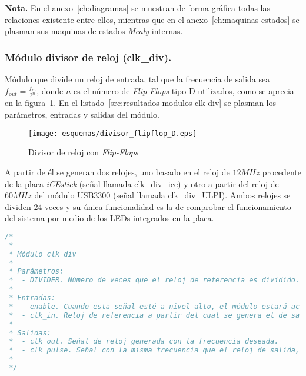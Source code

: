 \textbf{Nota.} En el anexo~\ref{ch:diagramas} se muestran de forma gráfica todas las relaciones existente entre ellos, mientras que en el anexo~\ref{ch:maquinas-estados} se plasman sus maquinas de estados \emph{Mealy} internas.

\subsubsection{Módulo divisor de reloj (clk\_div).}
Módulo que divide un reloj de entrada, tal que la frecuencia de salida sea $f_{out} = \frac{f_{in}}{2^n}$, donde $n$ es el número de \emph{Flip-Flops} tipo D utilizados, como se aprecia en la figura~\ref{fig:clk_div_esquema}. En el listado~\ref{src:resultados-modulos-clk-div} se plasman los parámetros, entradas y salidas del módulo.

\begin{figure}[hbt]
    \centering
    \texttt{[image: esquemas/divisor\_flipflop\_D.eps]}
    \caption{Divisor de reloj con \emph{Flip-Flops}}
    \label{fig:clk_div_esquema}
\end{figure}

A partir de él se generan dos relojes, uno basado en el reloj de $12MHz$ procedente de la placa \emph{iCEstick} (señal llamada clk\_div\_ice) y otro a partir del reloj de $60MHz$ del módulo USB3300 (señal  llamada clk\_div\_ULPI). Ambos relojes se dividen 24 veces y su única funcionalidad es la de  comprobar el funcionamiento del sistema por medio de los LEDs integrados en la placa.

\begin{lstlisting}[language=Verilog,
    caption={Parámetros, entradas y salidas del módulo clk\_div.},
    label=src:resultados-modulos-clk-div]
/*
 *
 * Módulo clk_div
 *
 * Parámetros:
 *  - DIVIDER. Número de veces que el reloj de referencia es dividido. f_clk_out = f_clk_in / (2^DIVIDER)
 *
 * Entradas:
 *  - enable. Cuando esta señal esté a nivel alto, el módulo estará activo, y en caso contrario la salida estará siempre a nivel bajo.
 *  - clk_in. Reloj de referencia a partir del cual se genera el de salida.
 *
 * Salidas:
 *  - clk_out. Señal de reloj generada con la frecuencia deseada.
 *  - clk_pulse. Señal con la misma frecuencia que el reloj de salida, pero con un ancho de pulso igual al del reloj de entrada.
 *
 */
\end{lstlisting}


